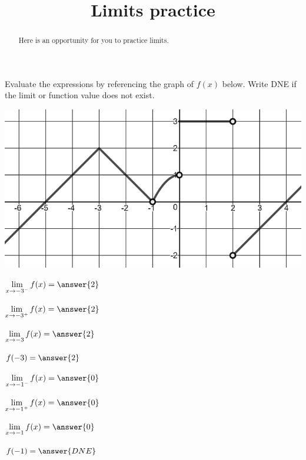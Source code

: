 \documentclass[handout]{ximera}
\title{Limits practice}
\begin{document}
\begin{abstract}
Here is an opportunity for you to practice limits.
\end{abstract}
\maketitle

\begin{exercise}
  Evaluate the expressions by referencing the graph of $f(x)$ below. Write DNE if the limit or function value does not exist.
  
\begin{center} \includegraphics[scale=0.5]{limgraph.png} \end{center}

\begin{enumerate}

\begin{multicols}{3}
\item $\displaystyle\lim_{x\to -3^-} f(x) =\answer{2}$  

\item $\displaystyle\lim_{x\to -3^+} f(x) = \answer{2}$ 

\item $\displaystyle\lim_{x\to -3} f(x) = \answer{2}$ 

\item $f(-3) = \answer{2}$

\item $\displaystyle\lim_{x\to -1^-} f(x) =\answer{0}$ 

\item $\displaystyle\lim_{x\to -1^+} f(x) = \answer{0}$ 

\item $\displaystyle\lim_{x\to -1} f(x) = \answer{0}$ 

\item $f(-1) = \answer{DNE}$


\end{multicols}
\end{enumerate}
\end{exercise}
\end{document}
